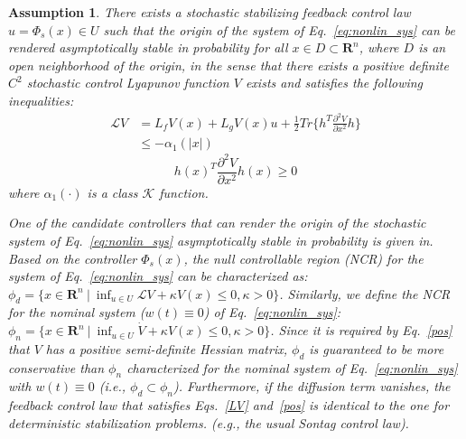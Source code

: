\documentclass[letterpaper, 10pt, conference]{ieeeconf}
\newtheorem{asm}{Assumption}
\begin{document}
	\begin{asm}
		There exists a stochastic stabilizing feedback control law $u=\Phi_s(x) \in U$ such that the origin of the system of Eq.~\ref{eq:nonlin_sys} can be rendered asymptotically stable in probability for all $x \in D \subset \mathbf{R}^n$, where $D$ is an open neighborhood of the origin, in the sense that there exists a positive definite $C^2$ stochastic control Lyapunov function $V$ exists and satisfies the following inequalities:
		\begin{equation}\label{LV}
		\begin{split}
		\mathcal{L}V&=L_fV(x)+L_gV(x)u+\frac{1}{2} Tr\{h^T\frac{\partial^2 V}{\partial x^2}h\}\\
		&\leq - \alpha_1(\vert x \vert)
		\end{split}
		\end{equation}
		\begin{equation}\label{pos}
		h(x)^T\frac{\partial^2 V}{\partial x^2}h(x) \geq 0
		\end{equation}
		where $\alpha_1(\cdot)$ is a class $\mathcal{K}$ function. 
		
		One of the candidate controllers that can render the origin of the stochastic system of Eq.~\ref{eq:nonlin_sys} asymptotically stable in probability is given in\cite{deng2001stabilization}. Based on the controller $\Phi_s(x)$, the null controllable region (NCR) for the system of Eq.~\ref{eq:nonlin_sys} can be characterized as: $\phi_d=\{ x \in \mathbf{R}^n ~|~ \inf_{ u \in U } \mathcal{L}V + \kappa V(x) \leq 0, \kappa > 0\}$. Similarly, we define the NCR for the nominal system ($w(t) \equiv 0$) of Eq.~\ref{eq:nonlin_sys}: $\phi_n=\{ x \in \mathbf{R}^n~|~ \inf_{ u \in U } \dot{V} + \kappa V(x) \leq 0, \kappa > 0\} $. Since it is required by Eq.~\ref{pos} that $V$ has a positive semi-definite Hessian matrix, $\phi_d$ is guaranteed to be more conservative than $\phi_n$ characterized for the nominal system of Eq.~\ref{eq:nonlin_sys} with $w(t) \equiv 0$ (i.e., $\phi_d \subset \phi_n$). Furthermore, if the diffusion term vanishes, the feedback control law that satisfies Eqs.~\ref{LV} and~\ref{pos} is identical to the one for deterministic stabilization problems. (e.g., the usual Sontag control law\cite{lin1991universal}). %
	\end{asm}
	
\end{document}
